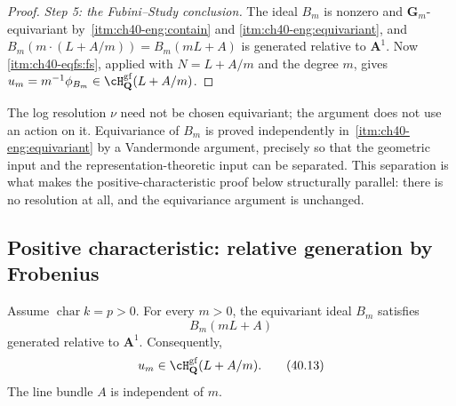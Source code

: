\begin{proof}
\emph{Step 5: the Fubini--Study conclusion.}  The ideal $B_m$ is nonzero
and $\mathbf G_m$-equivariant by
\,\cref{itm:ch40-eng:contain} and
\cref{itm:ch40-eng:equivariant}, and $B_m(m\cdot(L+A/m))=B_m(mL+A)$ is
generated relative to $\mathbf A^1$.  Now
\,\cref{itm:ch40-eqfs:fs}, applied with
$N=L+A/m$ and the degree $m$, gives
$u_m=m^{-1}\phi_{B_m}\in\cH^{\mathrm{gf}}_{\mathbf Q}(L+A/m)$.
\end{proof}

\begin{remark}
\label{rem:ch40-char-zero-resolution}
The log resolution $\nu$ need not be chosen equivariant; the
argument does not use an action on it.  Equivariance of $B_m$ is proved
independently in
\,\cref{itm:ch40-eng:equivariant} by a
Vandermonde argument, precisely so that the geometric input and the
representation-theoretic input can be separated.  This separation is what
makes the positive-characteristic proof below structurally parallel: there
is no resolution at all, and the equivariance argument is unchanged.
\end{remark}

\subsection{Positive characteristic: relative generation by Frobenius}
\label{sec:ch40-generation-char-p}

\begin{proposition}\label{prop:bj-smooth-uniform-generation}
Assume $\operatorname{char}k=p>0$.  For every $m>0$, the equivariant ideal $B_m$ satisfies
\[
                         B_m(mL+A)
\]
generated relative to $\mathbf A^1$.  Consequently,
\[
                         u_m\in\cH^{\mathrm{gf}}_{\mathbf Q}(L+A/m).
\tag{40.13}\label{eq:bj-smooth-gf-class}
\]
The line bundle $A$ is independent of $m$.
\end{proposition}

